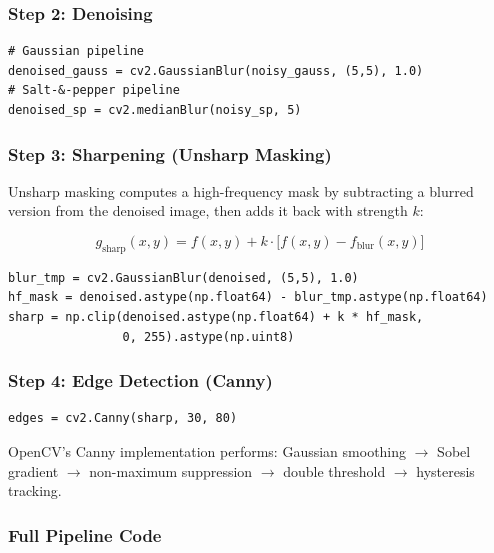 \documentclass[12pt,a4paper]{article}
\begin{document}
\subsubsection*{Step 2: Denoising}

\begin{lstlisting}
# Gaussian pipeline
denoised_gauss = cv2.GaussianBlur(noisy_gauss, (5,5), 1.0)
# Salt-&-pepper pipeline
denoised_sp = cv2.medianBlur(noisy_sp, 5)
\end{lstlisting}

\subsubsection*{Step 3: Sharpening (Unsharp Masking)}

Unsharp masking computes a high-frequency mask by subtracting a blurred version from the denoised image, then adds it back with strength $k$:

\begin{equation}
  g_\text{sharp}(x,y) = f(x,y) + k \cdot \bigl[ f(x,y) - f_\text{blur}(x,y) \bigr]
  \label{eq:unsharp}
\end{equation}

\begin{lstlisting}
blur_tmp = cv2.GaussianBlur(denoised, (5,5), 1.0)
hf_mask = denoised.astype(np.float64) - blur_tmp.astype(np.float64)
sharp = np.clip(denoised.astype(np.float64) + k * hf_mask,
                0, 255).astype(np.uint8)
\end{lstlisting}

\subsubsection*{Step 4: Edge Detection (Canny)}

\begin{lstlisting}
edges = cv2.Canny(sharp, 30, 80)
\end{lstlisting}

OpenCV's Canny implementation performs: Gaussian smoothing $\to$ Sobel gradient $\to$ non-maximum suppression $\to$ double threshold $\to$ hysteresis tracking.

\subsubsection*{Full Pipeline Code}
\end{document}
